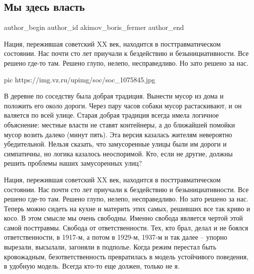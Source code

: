  
 
 
 
 
 
\subsection{Мы здесь власть}
\label{sec:16_12_2020.news.ru.vz.akimov_boris_fermer.1.my_zdes_vlast}
\ifcmt
	author_begin
   author_id akimov_boris_fermer
	author_end
\fi

Нация, пережившая советский XX век, находится в посттравматическом состоянии.
Нас почти сто лет приучали к бездействию и безынициативности. Все решено где-то
там. Решено глупо, нелепо, несправедливо. Но зато решено за нас.

\ifcmt
pic https://img.vz.ru/upimg/soc/soc_1075845.jpg
\fi

В деревне по соседству была добрая традиция. Вынести мусор из дома и положить
его около дороги. Через пару часов собаки мусор растаскивают, и он валяется по
всей улице. Старая добрая традиция всегда имела логичное объяснение: местные
власти не ставят контейнеры, а до ближайшей помойки мусор возить далеко (минут
пять). Эта версия казалась жителям невероятно убедительной. Нельзя сказать, что
замусоренные улицы были им дороги и симпатичны, но логика казалось неоспоримой.
Кто, если не другие, должны решить проблемы наших замусоренных улиц?

Нация, пережившая советский XX век, находится в посттравматическом состоянии.
Нас почти сто лет приучали к бездействию и безынициативности. Все решено где-то
там. Решено глупо, нелепо, несправедливо. Но зато решено за нас. Теперь можно
сидеть на кухне и материть этих самых, решивших все так криво и косо. В этом
смысле мы очень свободны. Именно свобода является чертой этой самой посттравмы.
Свобода от ответственности. Тех, кто брал, делал и не боялся ответственности, в
1917-м, а потом в 1929-м, 1937-м и так далее – упорно вырезали, высылали,
загоняли в подполье. Когда режим перестал быть кровожадным, безответственность
превратилась в модель устойчивого поведения, в удобную модель. Всегда кто-то
еще должен, только не я. 

